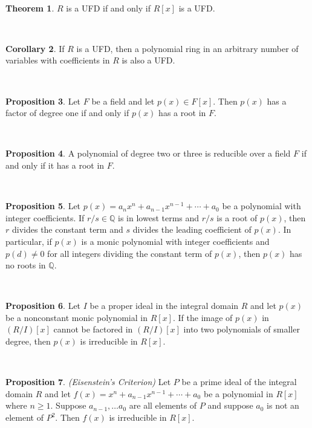 \documentclass{article}
\theoremstyle{definition}
\newtheorem{thm}{Theorem}[section]
\newtheorem{prop}[thm]{Proposition}
\newtheorem{cor}[thm]{Corollary}
\newcommand{\nl}{\vspace{4cm}\\}
\newcommand{\Q}{\mathbb{Q}}
\begin{document}
\nl

\begin{thm}
$R$ is a UFD if and only if $R[x]$ is a UFD.
\end{thm}

\nl

\begin{cor}
If $R$ is a UFD, then a polynomial ring in an arbitrary number of variables with coefficients in $R$ is also a UFD.
\end{cor}

\nl

\begin{prop}
Let $F$ be a field and let $p(x)\in F[x]$. Then $p(x)$ has a factor of degree one if and only if $p(x)$ has a root in $F$.
\end{prop}

\nl

\begin{prop}
A polynomial of degree two or three is reducible over a field $F$ if and only if it has a root in $F$.
\end{prop}

\nl

\begin{prop}
Let $p(x) = a_nx^n+ a_{n-1}x^{n-1} + \cdots +a_0$ be a polynomial with integer coefficients. If $r/s\in \Q$ is in lowest terms and $r/s$ is a root of $p(x)$, then $r$ divides the constant term and $s$ divides the leading coefficient of $p(x)$. In particular, if $p(x)$ is a monic polynomial with integer coefficients and $p(d) \neq 0$ for all integers dividing the constant term of $p(x)$, then $p(x)$ has no roots in $\Q$.
\end{prop}

\nl

\begin{prop}
Let $I$ be a proper ideal in the integral domain $R$ and let $p(x)$ be a nonconstant monic polynomial in $R[x]$. If the image of $p(x)$ in $(R/I)[x]$ cannot be factored in $(R/I)[x]$ into two polynomials of smaller degree, then $p(x)$ is irreducible in $R[x]$.
\end{prop} 

\nl

\begin{prop}\textit{(Eisenstein's Criterion)}
Let $P$ be a prime ideal of the integral domain $R$ and let $f(x) = x^n + a_{n-1}x^{n-1}+\cdots + a_0$ be a polynomial in $R[x]$ where $n\geq 1$. Suppose $a_{n-1}, \ldots a_0$ are all elements of $P$ and suppose $a_0$ is not an element of $P^2$. Then $f(x)$ is irreducible in $R[x]$.
\end{prop}
\end{document}
